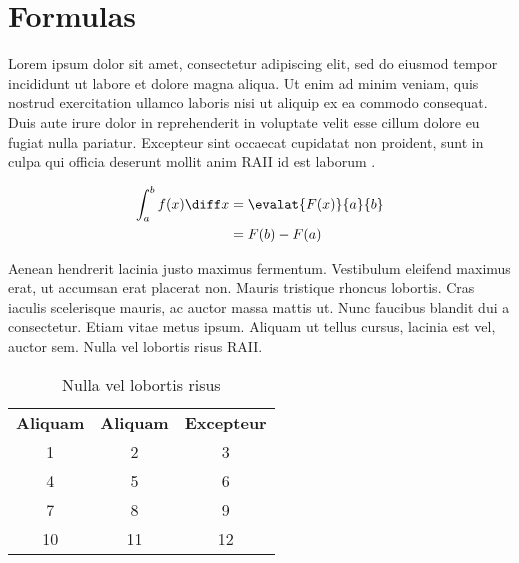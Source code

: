 \section{Formulas}

Lorem ipsum dolor sit amet, consectetur adipiscing elit, sed do eiusmod tempor
incididunt ut labore et dolore magna aliqua. Ut enim ad minim veniam, quis nostrud
exercitation ullamco laboris nisi ut aliquip ex ea commodo consequat. Duis aute
irure dolor in reprehenderit in voluptate velit esse cillum dolore eu fugiat nulla
pariatur. Excepteur sint occaecat cupidatat non proident, sunt in culpa qui officia
deserunt mollit anim \gls{RAII} id est laborum .

\begin{align}
    \int_a^b f(x) \diff x &= \evalat{F(x)}{a}{b} \\
                          &= F(b) - F(a)           
\end{align}

Aenean hendrerit lacinia justo maximus fermentum. Vestibulum eleifend maximus erat,
ut accumsan erat placerat non. Mauris tristique rhoncus lobortis. Cras iaculis
scelerisque mauris, ac auctor massa mattis ut. Nunc faucibus blandit dui a consectetur.
Etiam vitae metus ipsum. Aliquam ut tellus cursus, lacinia est vel, auctor sem.
Nulla vel lobortis risus \gls{RAII}.

\begin{table}[ht]
    \centering
    \begin{tabular}{ccc}
        \textbf{Aliquam} & \textbf{Aliquam} & \textbf{Excepteur} \\
            1            & 2                & 3                  \\
            4            & 5                & 6                  \\
            7            & 8                & 9                  \\
            10           & 11               & 12
    \end{tabular}
    \caption{Nulla vel lobortis risus}\label{tab:test}
\end{table}